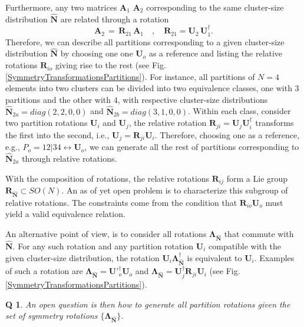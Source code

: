 \documentclass[twocolumn,aps,sort,nofootinbib]{revtex4}
\newtheorem{question}{Q}
\begin{document}
Furthermore, any two matrices $\mathbf{A}_1$ $\mathbf{A}_2$ corresponding to the same 
cluster-size distribution $\mathbf{\hat{N}}$ are related through
a rotation 
\begin{equation}
\mathbf{A}_2\,=\,\mathbf{R}_{21}\,\mathbf{A}_1\quad ,\quad\mathbf{R}_{21}=
\mathbf{U}_2\,\mathbf{U}_1^\dagger.
\end{equation}
Therefore, we can describe all partitions corresponding to
a given cluster-size distribution $\mathbf{\hat{N}}$ by
choosing one one $\mathbf{U}_o$ as a reference and listing
the relative rotations $\mathbf{R}_{io}$ 
giving rise to the rest (see Fig.\ref{SymmetryTransformationsPartitions}).
For instance, all partitions of $N=4$ elements into two clusters
can be divided into two equivalence classes, one with $3$ partitions and
the other with $4$, with respective cluster-size
distributions 
$\mathbf{\hat{N}}_{2a}=diag(2,2,0,0)$ 
and  
$\mathbf{\hat{N}}_{2b}=diag(3,1,0,0)$.
Within each class, consider two partition rotations $\mathbf{U}_i$ and $\mathbf{U}_j$,
the relative rotation $\mathbf{R}_{ji}=\mathbf{U}_j\mathbf{U}_i^\dagger$ 
transforms the first into the second, i.e.,
$\mathbf{U}_j=\mathbf{R}_{ji}\mathbf{U}_i$. Therefore, choosing one as a reference,
e.g., $P_o=12|34 \leftrightarrow \mathbf{U}_o$, we can generate all the rest of partitions corresponding
to $\mathbf{\hat{N}}_{2a}$ through relative rotations. 

With the composition of rotations, the relative rotations $\mathbf{R}_{ij}$
form a Lie group $\pmb{R}_{\mathbf{\hat{N}}}\subset SO(N)$.
An as of yet open problem is to characterize this subgroup of relative rotations.
The constraints come from the condition that $\mathbf{R}_{io}\mathbf{U}_o$ 
must yield a valid equivalence relation.

An alternative point of view, is to consider all rotations 
$\mathbf{\Lambda}_{\mathbf{\hat{N}}}$
that commute with $\mathbf{\hat{N}}$.
For any such rotation and any partition rotation $\mathbf{U}_i$
compatible with the given cluster-size distribution, the rotation
$\mathbf{U}_i\mathbf{\Lambda}_{\mathbf{\hat{N}}}^\dagger$
is equivalent to $\mathbf{U}_i$. 
Examples of
such a rotation are  $\mathbf{\Lambda}_{\mathbf{\hat{N}}}=\mathbf{U'}_o^\dagger\mathbf{U}_o$ and 
$\mathbf{\Lambda}_{\mathbf{\hat{N}}}=\mathbf{U}_j^\dagger\mathbf{R}_{ji}\mathbf{U}_i$
(see Fig.\ref{SymmetryTransformationsPartitions}).
\begin{question}
An open question is then how to generate all partition rotations
given the set of symmetry rotations $\{\mathbf{\Lambda}_{\mathbf{\hat{N}}}\}$.
\end{question}
\end{document}
